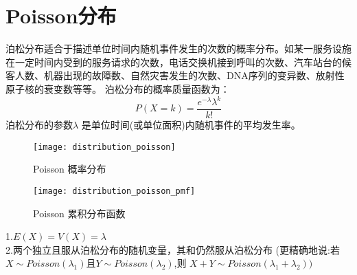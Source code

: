\documentclass[openany]{book}
\begin{document}
\section{Poisson分布}
\label{sec.distribution.poisson}
泊松分布适合于描述单位时间内随机事件发生的次数的概率分布。如某一服务设施在一定时间内受到的服务请求的次数，电话交换机接到呼叫的次数、汽车站台的候客人数、机器出现的故障数、自然灾害发生的次数、DNA序列的变异数、放射性原子核的衰变数等等。
泊松分布的概率质量函数为：
$$
P(X=k)={\frac  {e^{{-\lambda }}\lambda ^{k}}{k!}}
$$
泊松分布的参数$\lambda$ 是单位时间(或单位面积)内随机事件的平均发生率。
\begin{figure}[htbp]
  \centering
  \texttt{[image: distribution\_poisson]}\\
  \caption{Poisson 概率分布}\label{fig.distribution.poisson}
\end{figure}

\begin{figure}[htbp]
  \centering
  \texttt{[image: distribution\_poisson\_pmf]}\\
  \caption{Poisson 累积分布函数}\label{fig.distribution.poisson.pmf}
\end{figure}
	
1.$E(X)=V(X)=\lambda$ \\
2.两个独立且服从泊松分布的随机变量，其和仍然服从泊松分布 (更精确地说:若$X \sim Poisson(\lambda_1)$且$Y \sim Poisson(\lambda_2)$,则 $X+Y \sim Poisson(\lambda_1+\lambda_2))$
\end{document}
